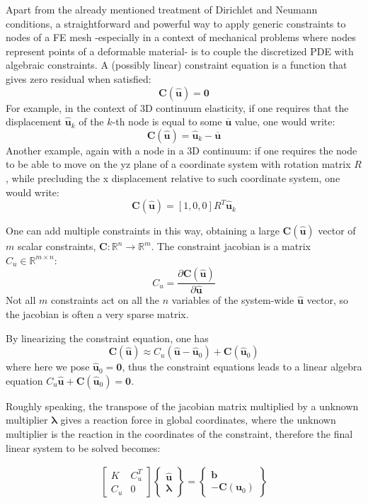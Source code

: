 \documentclass{digitaldynamics}
\def\vect#1{\bm{#1}}
\def\matr#1{{#1}}
\begin{document}
Apart from the already mentioned treatment of Dirichlet and Neumann conditions, a straightforward and powerful way to apply generic constraints to nodes of a FE mesh -especially in a context of mechanical problems where nodes represent points of a deformable material- is to couple the discretized PDE with algebraic constraints. A (possibly linear) constraint equation is a function that gives zero residual when satisfied:
\[
\vect{C}(\hat{\vect{u}})=\vect{0}
\]
For example, in the context of 3D continuum elasticity, if one requires that the displacement $\hat{\vect{u}}_k$ of the $k$-th node is equal to some $\overline{\vect{u}}$ value, one would write:
\[
\vect{C}(\hat{\vect{u}}) = \hat{\vect{u}}_k - \overline{\vect{u}} 
\]
Another example, again with a node in a 3D continuum: if one requires the node to be able to move on the yz plane of a coordinate system with rotation matrix $\matr{R}$, while precluding the x displacement relative to such coordinate system, one would write:
\[
\vect{C}(\hat{\vect{u}}) = [1, 0, 0] \matr{R}^T \hat{\vect{u}}_k  
\]

One can add multiple constraints in this way, obtaining a large $\vect{C}(\hat{\vect{u}})$ vector of $m$ scalar constraints, $\vect{C}:\mathbb{R}^n \rightarrow \mathbb{R}^m$. 
The constraint jacobian is a matrix $\matr{C}_u \in \mathbb{R}^{m \times n}$:
\[
\matr{C}_u = \frac{\partial \vect{C}(\hat{\vect{u}})}{\partial \hat{\vect{u}}}
\]
Not all $m$ constraints act on all the $n$ variables of the system-wide $\hat{\vect{u}}$ vector, so the jacobian is often a very sparse matrix.

By linearizing the constraint equation, one has
\[
\vect{C}(\hat{\vect{u}}) \approx \matr{C}_u (\hat{\vect{u}}-\hat{\vect{u}}_0) + \vect{C}(\hat{\vect{u}}_0)
\]
where here we pose $\hat{\vect{u}}_0 = \vect{0}$, thus the constraint equations leads to a linear algebra equation 
$\matr{C}_u \hat{\vect{u}} + \vect{C}(\hat{\vect{u}}_0) = \vect{0}$.

Roughly speaking, the transpose of the jacobian matrix multiplied by a unknown multiplier $\vect{\lambda}$ gives a reaction force in global coordinates, where the unknown multiplier is the reaction in the coordinates of the constraint, therefore the final linear system to be solved becomes:

\begin{align}
\boxed{
\begin{bmatrix}
	\matr{K} & \matr{C}_u^T \\
	\matr{C}_u  & \matr{0}
\end{bmatrix}
\begin{Bmatrix}
	\hat{\vect{u}} \\
	\vect{\lambda}
\end{Bmatrix}
=
\begin{Bmatrix}
	\vect{b} \\
	-\vect{C}(\vect{u}_0)
\end{Bmatrix}
}
\end{align}
\end{document}
